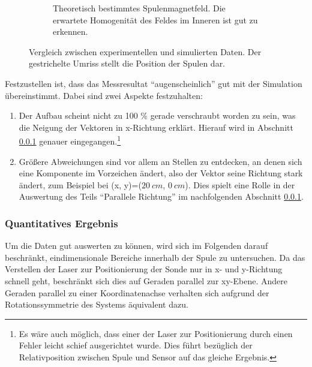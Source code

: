 \documentclass[12pt,a4paper]{article}
\begin{document}
\begin{figure}[H]
\begin{subfigure}[c]{0.8\textwidth}
		\caption{Theoretisch bestimmtes Spulenmagnetfeld. Die erwartete Homogenität des Feldes im Inneren ist gut zu erkennen.}
	\end{subfigure}
	\caption{Vergleich zwischen experimentellen und simulierten Daten. Der gestrichelte Umriss stellt die Position der Spulen dar.}
\end{figure}
Festzustellen ist, dass das Messresultat "`augenscheinlich"' gut mit der Simulation übereinstimmt. Dabei sind zwei Aspekte festzuhalten:
\begin{enumerate}
	\item Der Aufbau scheint nicht zu 100 \% gerade verschraubt worden zu sein, was die Neigung der Vektoren in x-Richtung erklärt. Hierauf wird in Abschnitt \ref{quant} genauer eingegangen.\footnote{Es wäre auch möglich, dass einer der Laser zur Positionierung durch einen Fehler leicht schief ausgerichtet wurde. Dies führt bezüglich der Relativposition zwischen Spule und Sensor auf das gleiche Ergebnis.}
	\item Größere Abweichungen sind vor allem an Stellen zu entdecken, an denen sich eine Komponente im Vorzeichen ändert, also der Vektor seine Richtung stark ändert, zum Beispiel bei (x, y)=($\SI{20}{cm}$, $\SI{0}{cm}$). Dies spielt eine Rolle in der Auswertung des Teils "`Parallele Richtung"' im nachfolgenden Abschnitt \ref{quant}.
\end{enumerate}
\subsubsection{Quantitatives Ergebnis}
\label{quant}
Um die Daten gut auswerten zu können, wird sich im Folgenden darauf beschränkt, eindimensionale Bereiche innerhalb der Spule zu untersuchen. Da das Verstellen der Laser zur Positionierung der Sonde nur in x- und y-Richtung schnell geht, beschränkt sich dies auf Geraden parallel zur xy-Ebene. Andere Geraden parallel zu einer Koordinatenachse verhalten sich aufgrund der Rotationssymmetrie des Systems äquivalent dazu.\\
\end{document}
